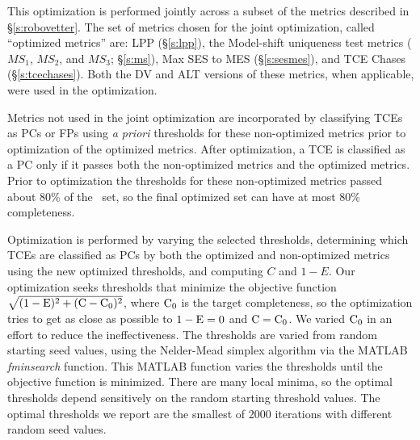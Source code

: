 
This optimization is performed jointly across a subset of the metrics described in \S\ref{s:robovetter}.  The set of metrics chosen for the joint optimization, called ``optimized metrics'' are: LPP (\S\ref{s:lpp}), the Model-shift uniqueness test metrics ($MS_{1}$, $MS_{2}$, and $MS_{3}$; \S\ref{s:ms}), Max SES to MES (\S\ref{s:sesmes}), and TCE Chases (\S\ref{s:tcechases}). Both the DV and ALT versions of these metrics, when applicable, were used in the optimization.


Metrics not used in the joint optimization are incorporated by classifying TCEs as PCs or FPs using {\it a priori} thresholds for these non-optimized metrics prior to optimization of the optimized metrics.  After optimization, a TCE is classified as a PC only if it passes both the non-optimized metrics and the optimized metrics.  Prior to optimization the thresholds for these non-optimized metrics passed about 80\% of the  \injtce\ set, so the final optimized set can have at most 80\% completeness.

Optimization is performed by varying the selected thresholds, determining which TCEs are classified as PCs by both the optimized and non-optimized metrics using the new optimized thresholds, and computing $C$ and $1-E$.  Our optimization seeks thresholds that minimize the objective function $\sqrt{{(\rm 1-E})^2 + ({\rm C} - {\rm C}_0)^2}$, where ${\rm C}_0$ is the target completeness, so the optimization tries to get as close as possible to ${\rm 1-E} = 0$ and ${\rm C} = {\rm C}_0$.  We varied ${\rm C}_0$ in an effort to reduce the ineffectiveness. The thresholds are varied from random starting seed values, using the Nelder-Mead simplex algorithm via the \textsc{MATLAB} {\it fminsearch} function.  This \textsc{MATLAB} function varies the thresholds until the objective function is minimized.  There are many local minima, so the optimal thresholds depend sensitively on the random starting threshold values.  The optimal thresholds we report are the smallest of 2000 iterations with different random seed values.

